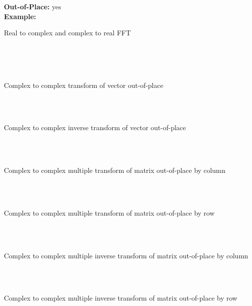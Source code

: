 {%
\hspace*{1.1cm}\textbf{Out-of-Place: }\hspace{.2cm} yes\\
\hspace*{1.1cm}\textbf{Example: }\\
\hspace*{1.4cm}\parbox[t]{.8\textwidth}{Real to complex and complex to real FFT\\
\hspace*{.5cm}\\
\hspace*{.5cm}}\\\\
\hspace*{1.4cm}\parbox[t]{.8\textwidth}{Complex to complex transform of vector  out-of-place\\
\hspace*{.5cm}}\\\\
 \hspace*{1.4cm}\parbox[t]{.8\textwidth}{Complex to complex inverse transform of vector  out-of-place\\
\hspace*{.5cm}}\\\\
 \hspace*{1.4cm}\parbox[t]{.8\textwidth}{Complex to complex multiple transform of matrix  out-of-place by column\\
\hspace*{.5cm}}\\\\
 \hspace*{1.4cm}\parbox[t]{.8\textwidth}{Complex to complex multiple transform of matrix  out-of-place by row\\
\hspace*{.5cm}}\\\\
 \hspace*{1.4cm}\parbox[t]{.8\textwidth}{Complex to complex multiple inverse transform of matrix  out-of-place by column\\
\hspace*{.5cm}}\\\\
 \hspace*{1.4cm}\parbox[t]{.8\textwidth}{Complex to complex multiple inverse transform of matrix  out-of-place by row\\
}}
